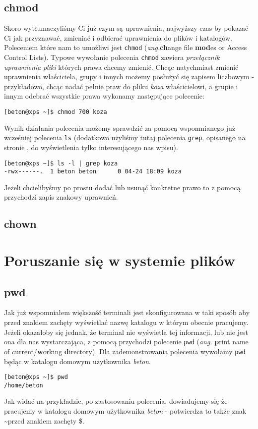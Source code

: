 \subsection{chmod}
\label{sec:chmod}
Skoro wytłumaczyliśmy Ci już czym są uprawnienia, najwyższy czas by pokazać Ci jak przyznawać, zmieniać i odbierać uprawnienia do plików i katalogów. Poleceniem które nam to umożliwi jest \texttt{chmod} (\textit{ang.}\textbf{ch}ange file \textbf{mod}es or Access Control Lists). Typowe wywołanie polecenia \texttt{chmod} zawiera \textit{przełącznik} \textit{uprawnienia} \textit{pliki} których prawa chcemy zmienić. Chcąc natychmiast zmienić uprawnienia właściciela, grupy i innych możemy posłużyć się zapisem liczbowym - przykładowo, chcąc nadać pełnie praw do pliku \textit{koza} właścicielowi, a grupie i innym odebrać wszystkie prawa wykonamy następujące polecenie:
\begin{verbatim}
[beton@xps ~]$ chmod 700 koza
\end{verbatim}
Wynik działania polecenia możemy sprawdzić za pomocą wspomnianego już wcześniej polecenia \texttt{ls} (dodatkowo użyliśmy tutaj polecenia \texttt{grep}, opisanego na stronie \pageref{sec:grep}, do wyświetlenia tylko interesującego nas wpisu).
\begin{verbatim}
[beton@xps ~]$ ls -l | grep koza
-rwx------.  1 beton beton      0 04-24 18:09 koza
\end{verbatim}
Jeżeli chcielibyśmy po prostu dodać lub usunąć konkretne prawo to z pomocą przychodzi zapis znakowy uprawnień. 

\subsection{chown}

\section{Poruszanie się w systemie plików}
\subsection{pwd}
Jak już wspomniałem większość terminali jest skonfigurowana w taki sposób aby przed znakiem zachęty wyświetlać nazwę katalogu w którym obecnie pracujemy. Jeżeli okazałoby się jednak, że terminal nie wyświetla tej informacji, lub nie jest ona dla nas wystarczająca, z pomocą przychodzi polecenie \texttt{pwd} (\textit{ang.} \textbf{p}rint name of current/\textbf{w}orking \textbf{d}irectory). Dla zademonstrowania polecenia wywołamy \texttt{pwd} będąc w katalogu domowym użytkownika \textit{beton}.
\begin{verbatim}
[beton@xps ~]$ pwd
/home/beton
\end{verbatim} 
Jak widać na przykładzie, po zastosowaniu polecenia, dowiadujemy się że pracujemy w katalogu domowym użytkownika \textit{beton} - potwierdza to także znak \textasciitilde przed znakiem zachęty \$.

